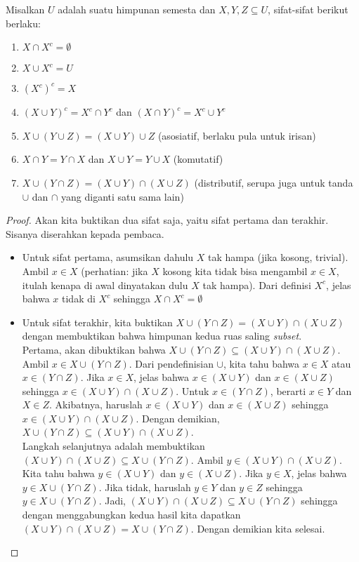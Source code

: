 	\begin{theorem}
		Misalkan $U$ adalah suatu himpunan semesta dan $X,Y,Z \subseteq U$, sifat-sifat berikut berlaku:
		\begin{enumerate}
			\item $X \cap X^c = \emptyset$
			\item $X \cup X^c = U$
			\item $(X^c)^c = X$
			\item ${(X \cup Y)}^c = X^c \cap Y^c$ dan ${(X \cap Y)}^c = X^c \cup Y^c$
			\item $X \cup (Y \cup Z) = (X \cup Y) \cup Z$ (asosiatif, berlaku pula untuk irisan)
			\item $X \cap Y = Y \cap X$ dan $X \cup Y = Y \cup X$ (komutatif)
			\item $X \cup (Y \cap Z) = (X \cup Y) \cap (X \cup Z)$ (distributif, serupa juga untuk tanda $\cup$ dan $\cap$ yang diganti satu sama lain)
		\end{enumerate}
	\end{theorem}
	\begin{proof}
		Akan kita buktikan dua sifat saja, yaitu sifat pertama dan terakhir. Sisanya diserahkan kepada pembaca.
		\begin{itemize}
			\item Untuk sifat pertama, asumsikan dahulu $X$ tak hampa (jika kosong, trivial). Ambil $x \in X$ (perhatian: jika $X$ kosong kita tidak bisa mengambil $x \in X$, itulah kenapa di awal dinyatakan dulu $X$ tak hampa). Dari definisi $X^c$, jelas bahwa $x$ tidak di $X^c$ sehingga $X \cap X^c = \emptyset$
			\item Untuk sifat terakhir, kita buktikan  $X \cup (Y \cap Z) = (X \cup Y) \cap (X \cup Z)$ dengan membuktikan bahwa himpunan kedua ruas saling \textit{subset}.
			\\
			
			Pertama, akan dibuktikan bahwa  $X \cup (Y \cap Z) \subseteq (X \cup Y) \cap (X \cup Z)$. Ambil $x \in X \cup (Y \cap Z)$. Dari pendefinisian $\cup$, kita tahu bahwa $x \in X$ atau $x \in (Y \cap Z)$. Jika $x \in X$, jelas bahwa $x \in (X \cup Y)$ dan $x \in (X \cup Z)$ sehingga $x \in (X \cup Y) \cap (X \cup Z)$. Untuk $x \in (Y \cap Z)$, berarti $x \in Y$ dan $X \in Z$. Akibatnya, haruslah $x \in (X \cup Y)$ dan $x \in (X \cup Z)$ sehingga $x \in (X \cup Y) \cap (X \cup Z)$. Dengan demikian,  $X \cup (Y \cap Z) \subseteq (X \cup Y) \cap (X \cup Z)$.
			\\
			
			Langkah selanjutnya adalah membuktikan $(X \cup Y) \cap (X \cup Z) \subseteq X \cup (Y \cap Z)$. Ambil $y \in (X \cup Y) \cap (X \cup Z)$. Kita tahu bahwa $y \in (X \cup Y)$ dan $y \in (X \cup Z)$. Jika $y \in X$, jelas bahwa $y \in  X \cup (Y \cap Z)$. Jika tidak, haruslah $y \in Y$ dan $y \in Z$ sehingga $y \in  X \cup (Y \cap Z)$. Jadi, $(X \cup Y) \cap (X \cup Z) \subseteq X \cup (Y \cap Z)$ sehingga dengan menggabungkan kedua hasil kita dapatkan $(X \cup Y) \cap (X \cup Z) = X \cup (Y \cap Z)$. Dengan demikian kita selesai.
		\end{itemize}
	\end{proof}
